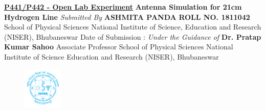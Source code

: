 \documentclass[12pt]{article}
\begin{document}
\doublespace
\begin{titlepage}
	\begin{center}
		\vspace*{0.2cm}
		\textbf{\uline{P441/P442 - Open Lab Experiment}} \linebreak
		\vspace{1.5cm}\linebreak
		\textbf{\Large{Antenna Simulation for 21cm Hydrogen Line}}\linebreak
		\vspace{2cm} \linebreak
		\textit{Submitted By} \linebreak \textbf{ASHMITA PANDA} \linebreak 
		\textbf{ROLL NO. 1811042} \linebreak
		School of Physical Sciences \linebreak National Institute of Science, Education and Research (NISER), Bhubaneswar \linebreak
		Date of Submission : 
		\vspace{2.5cm} \linebreak
		\textit{Under the Guidance of} \linebreak \textbf{Dr. Pratap Kumar Sahoo} \linebreak Associate Professor \linebreak School of Physical Sciences \linebreak National Institute of Science Education and Research (NISER), Bhubaneswar
		\vspace{1cm} \linebreak

	\end{center}
	\begin{figure}[H]
		\centering
		\includegraphics[width=0.17\textwidth]{niser logo}
	\end{figure}
\end{titlepage}

\raggedright
\newpage
{}

\singlespacing
\tableofcontents
{}
\onehalfspacing
\end{document}
